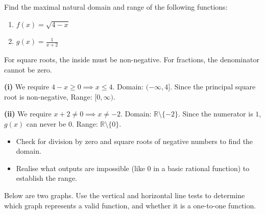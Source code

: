 
\begin{problem}
Find the maximal natural domain and range of the following functions:
\begin{enumerate}[label=(\roman*)]
\item $f(x) = \sqrt{4-x}$
\item $g(x) = \frac{1}{x+2}$
\end{enumerate}
\end{problem}

\begin{hint}
For square roots, the inside must be non-negative. For fractions, the denominator cannot be zero.
\end{hint}

\begin{solution}
\textbf{(i)} We require $4-x \ge 0 \implies x \le 4$.
Domain: $(-\infty, 4]$. 
Since the principal square root is non-negative, Range: $[0, \infty)$.

\textbf{(ii)} We require $x+2 \ne 0 \implies x \ne -2$.
Domain: $\mathbb{R} \setminus \{-2\}$.
Since the numerator is $1$, $g(x)$ can never be $0$. Range: $\mathbb{R} \setminus \{0\}$.
\end{solution}

\begin{takeaways}
\begin{itemize}[leftmargin=*]
\item Check for division by zero and square roots of negative numbers to find the domain.
\item Realise what outputs are impossible (like 0 in a basic rational function) to establish the range.
\end{itemize}
\end{takeaways}

\begin{problem}
Below are two graphs. Use the vertical and horizontal line tests to determine which graph represents a valid function, and whether it is a one-to-one function.

\begin{center}
\quad
{}
\end{center}
\end{problem}


